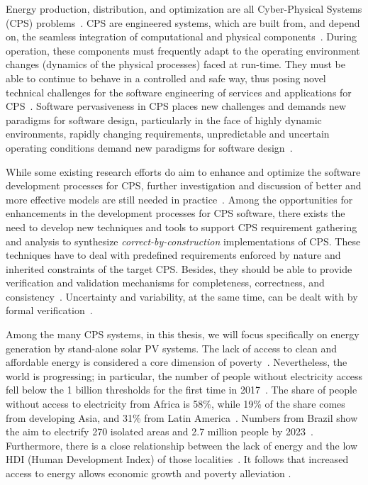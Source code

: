 Energy production, distribution, and optimization are all Cyber-Physical Systems (CPS) problems~\cite{UC}. CPS are engineered systems, which are built from, and depend on, the seamless integration of computational and physical components~\cite{NSF2015,ChavesIBCF19,iet-cps.2018.5006}. During operation, these components must frequently adapt to the operating environment changes (dynamics of the physical processes) faced at run-time. They must be able to continue to behave in a controlled and safe way, thus posing novel technical challenges for the software engineering of services and applications for CPS~\cite{Metzger2014}. Software pervasiveness in CPS places new challenges and demands new paradigms for software design, particularly in the face of highly dynamic environments, rapidly changing requirements, unpredictable and uncertain operating conditions demand new paradigms for software design~\cite{Filieri2015}.

While some existing research efforts do aim to enhance and optimize the software development processes for CPS, further investigation and discussion of better and more effective models are still needed in practice~\cite{Al-Jaroodi2016}. Among the opportunities for enhancements in the development processes for CPS software, there exists the need to develop new techniques and tools to support CPS requirement gathering and analysis to synthesize \textit{correct-by-construction} implementations of CPS. These techniques have to deal with predefined requirements enforced by nature and inherited constraints of the target CPS. Besides, they should be able to provide verification and validation mechanisms for completeness, correctness, and consistency~\cite{Al-Jaroodi2016}. Uncertainty and variability, at the same time, can be dealt with by formal verification~\cite{NESSI}. 

Among the many CPS systems, in this thesis, we will focus specifically on energy generation by stand-alone solar PV systems. The lack of access to clean and affordable energy is considered a core dimension of poverty~\cite{Hussein2012}. Nevertheless, the world is progressing; in particular, the number of people without electricity access fell below the 1 billion thresholds for the first time in 2017~\cite{IEAweo2018}. The share of people without access to electricity from Africa is 58\%, while 19\% of the share comes from developing Asia, and 31\% from Latin America~\cite{IEAweo2018}. Numbers from Brazil show the aim to electrify 270 isolated areas and 2.7 million people by 2023~\cite{EPE2018}. 
Furthermore, there is a close relationship between the lack of energy and the low HDI (Human Development Index) of those localities~\cite{Coelho}. It follows that increased access to energy allows economic growth and poverty alleviation \cite{Karekesi}.

